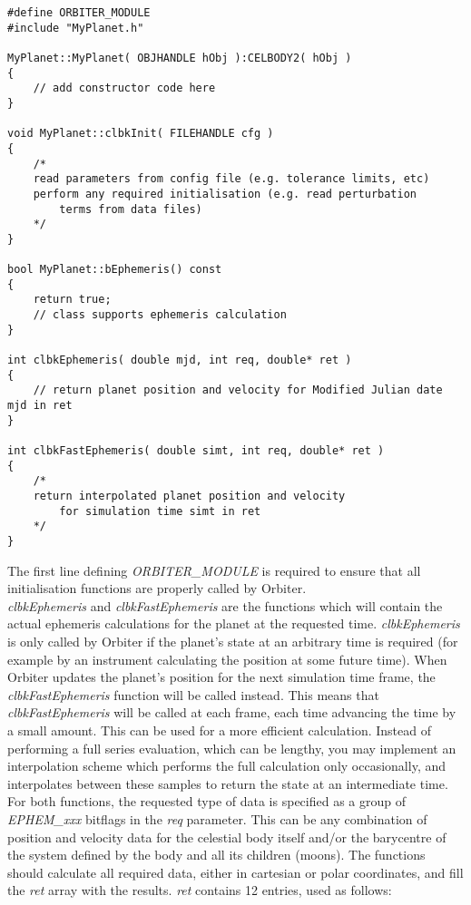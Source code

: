 \documentclass[Orbiter Developer Manual.tex]{subfiles}
\begin{document}
\begin{lstlisting}
#define ORBITER_MODULE
#include "MyPlanet.h"

MyPlanet::MyPlanet( OBJHANDLE hObj ):CELBODY2( hObj )
{
	// add constructor code here
}

void MyPlanet::clbkInit( FILEHANDLE cfg )
{
	/*
	read parameters from config file (e.g. tolerance limits, etc)
	perform any required initialisation (e.g. read perturbation
		terms from data files)
	*/
}

bool MyPlanet::bEphemeris() const
{
	return true;
	// class supports ephemeris calculation
}

int clbkEphemeris( double mjd, int req, double* ret )
{
	// return planet position and velocity for Modified Julian date mjd in ret
}

int clbkFastEphemeris( double simt, int req, double* ret )
{
	/*
	return interpolated planet position and velocity
		for simulation time simt in ret
	*/
}
\end{lstlisting}

\noindent
The first line defining \textit{ORBITER\_MODULE} is required to ensure that all initialisation functions are properly called by Orbiter.\\
\textit{clbkEphemeris} and \textit{clbkFastEphemeris} are the functions which will contain the actual ephemeris calculations for the planet at the requested time. \textit{clbkEphemeris} is only called by Orbiter if the planet’s state at an arbitrary time is required (for example by an instrument calculating the position at some future time). When Orbiter updates the planet’s position for the next simulation time frame, the \textit{clbkFastEphemeris} function will be called instead. This means that \textit{clbkFastEphemeris} will be called at each frame, each time advancing the time by a small amount. This can be used for a more efficient calculation. Instead of performing a full series evaluation, which can be lengthy, you may implement an interpolation scheme which performs the full calculation only occasionally, and interpolates between these samples to return the state at an intermediate time.\\
For both functions, the requested type of data is specified as a group of \textit{EPHEM\_xxx} bitflags in the \textit{req} parameter. This can be any combination of position and velocity data for the celestial body itself and/or the barycentre of the system defined by the body and all its children (moons). The functions should calculate all required data, either in cartesian or polar coordinates, and fill the \textit{ret} array with the results. \textit{ret} contains 12 entries, used as follows:
\end{document}
